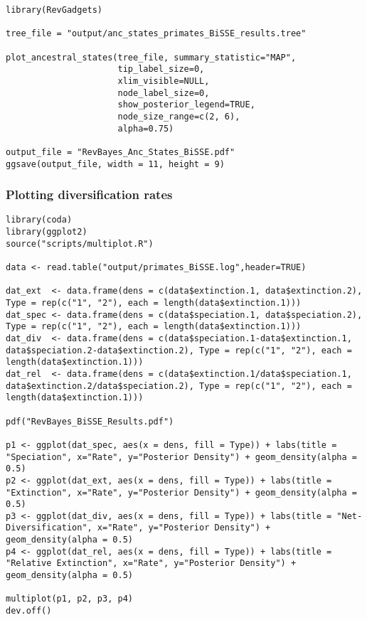 {\tt \begin{snugshade*}
\begin{lstlisting}
library(RevGadgets)

tree_file = "output/anc_states_primates_BiSSE_results.tree"

plot_ancestral_states(tree_file, summary_statistic="MAP",
                      tip_label_size=0,
                      xlim_visible=NULL,
                      node_label_size=0,
                      show_posterior_legend=TRUE,
                      node_size_range=c(2, 6),
                      alpha=0.75)

output_file = "RevBayes_Anc_States_BiSSE.pdf"
ggsave(output_file, width = 11, height = 9)
\end{lstlisting}
\end{snugshade*}}

\subsubsection{Plotting diversification rates}


{\tt \begin{snugshade*}
\begin{lstlisting}
library(coda)
library(ggplot2)
source("scripts/multiplot.R")

data <- read.table("output/primates_BiSSE.log",header=TRUE)

dat_ext  <- data.frame(dens = c(data$extinction.1, data$extinction.2), Type = rep(c("1", "2"), each = length(data$extinction.1)))
dat_spec <- data.frame(dens = c(data$speciation.1, data$speciation.2), Type = rep(c("1", "2"), each = length(data$extinction.1)))
dat_div  <- data.frame(dens = c(data$speciation.1-data$extinction.1, data$speciation.2-data$extinction.2), Type = rep(c("1", "2"), each = length(data$extinction.1)))
dat_rel  <- data.frame(dens = c(data$extinction.1/data$speciation.1, data$extinction.2/data$speciation.2), Type = rep(c("1", "2"), each = length(data$extinction.1)))

pdf("RevBayes_BiSSE_Results.pdf")

p1 <- ggplot(dat_spec, aes(x = dens, fill = Type)) + labs(title = "Speciation", x="Rate", y="Posterior Density") + geom_density(alpha = 0.5)
p2 <- ggplot(dat_ext, aes(x = dens, fill = Type)) + labs(title = "Extinction", x="Rate", y="Posterior Density") + geom_density(alpha = 0.5)
p3 <- ggplot(dat_div, aes(x = dens, fill = Type)) + labs(title = "Net-Diversification", x="Rate", y="Posterior Density") + geom_density(alpha = 0.5)
p4 <- ggplot(dat_rel, aes(x = dens, fill = Type)) + labs(title = "Relative Extinction", x="Rate", y="Posterior Density") + geom_density(alpha = 0.5)

multiplot(p1, p2, p3, p4)
dev.off()
\end{lstlisting}
\end{snugshade*}}



